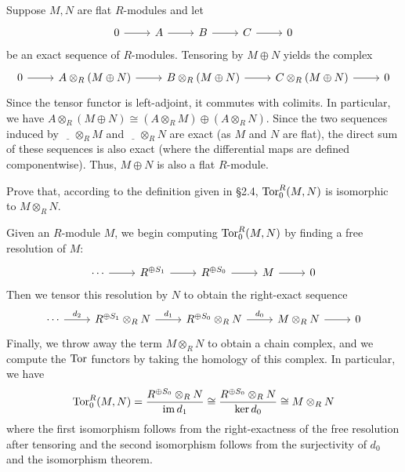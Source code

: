 \documentclass[../../master.tex]{subfiles}
\begin{document}
\begin{solution}
    Suppose $M, N$ are flat $R$-modules and let
    \[
    \begin{tikzcd}
        0 & A & B & C & 0
        \arrow[from=1-1, to=1-2]
        \arrow[from=1-2, to=1-3]
        \arrow[from=1-3, to=1-4]
        \arrow[from=1-4, to=1-5] 
    \end{tikzcd}
    \]
    be an exact sequence of $R$-modules.
    Tensoring by $M \oplus N$ yields the complex
    \[
    \begin{tikzcd}
        0 & A \otimes_R (M \oplus N) & B \otimes_R (M \oplus N) & C \otimes_R (M \oplus N) & 0
        \arrow[from=1-1, to=1-2]
        \arrow[from=1-2, to=1-3]
        \arrow[from=1-3, to=1-4]
        \arrow[from=1-4, to=1-5] 
    \end{tikzcd}
    \]
    Since the tensor functor is left-adjoint, it commutes with colimits.
    In particular, we have $A \otimes_R (M \oplus N) \cong (A \otimes_R M) \oplus (A \otimes_R N)$.
    Since the two sequences induced by $\underline{\hspace{1em}} \otimes_R M$ and $\underline{\hspace{1em}} \otimes_R N$ are exact (as $M$ and $N$ are flat), the direct sum of these sequences is also exact (where the differential maps are defined componentwise).
    Thus, $M \oplus N$ is also a flat $R$-module.
\end{solution}

\begin{problem}
    Prove that, according to the definition given in \S 2.4, $\operatorname{Tor}_0^{R}(M, N)$ is isomorphic to $M \otimes_R N$.
\end{problem}

\begin{solution}
    Given an $R$-module $M$, we begin computing $\operatorname{Tor}_0^{R}(M, N)$ by finding a free resolution of $M$:
    \[
    \begin{tikzcd}
        \cdots & R^{\oplus S_1} & R^{\oplus S_0} & M & 0
        \arrow[from=1-1, to=1-2]
        \arrow[from=1-2, to=1-3]
        \arrow[from=1-3, to=1-4]
        \arrow[from=1-4, to=1-5] 
    \end{tikzcd}
    \]
    Then we tensor this resolution by $N$ to obtain the right-exact sequence
    \[
    \begin{tikzcd}
        \cdots & R^{\oplus S_1} \otimes_R N & R^{\oplus S_0} \otimes_R N & M \otimes_R N & 0
        \arrow["d_2", from=1-1, to=1-2]
        \arrow["d_1", from=1-2, to=1-3]
        \arrow["d_0", from=1-3, to=1-4]
        \arrow[from=1-4, to=1-5] 
    \end{tikzcd}
    \]
    Finally, we throw away the term $M \otimes_R N$ to obtain a chain complex, and we compute the $\operatorname{Tor}$ functors by taking the homology of this complex.
    In particular, we have
    \[
        \operatorname{Tor}_0^{R}(M, N) = \frac{R^{\oplus S_0} \otimes_R N}{\operatorname{im} d_1} \cong \frac{R^{\oplus S_0} \otimes_R N}{\ker d_0} \cong M \otimes_R N
    \]
    where the first isomorphism follows from the right-exactness of the free resolution after tensoring and the second isomorphism follows from the surjectivity of $d_0$ and the isomorphism theorem.
\end{solution}
\end{document}
